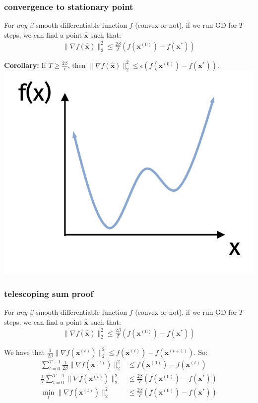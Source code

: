 \documentclass[compress]{beamer}
\newcommand{\bv}[1]{\mathbf{#1}}
\begin{document}
\begin{frame}[t]
	\frametitle{convergence to stationary point}
	\begin{theorem}
	For \emph{any} $\beta$-smooth differentiable function $f$ (convex or not), if we run GD for $T$ steps, we can find a point $\hat{\bv{x}}$ such that:
	\begin{align*}
		\|\nabla f(\hat{\bv{x}})\|_2^2 \leq  \frac{2\beta}{T} \left( f(\bv{x}^{(0)}) -  f(\bv{x}^{*})\right)
	\end{align*} 
\end{theorem}
\textbf{Corollary:} If $T \geq \frac{2\beta}{\epsilon}$, then $\|\nabla f(\hat{\bv{x}})\|_2^2 \leq \epsilon  \left( f(\bv{x}^{(0)}) -  f(\bv{x}^{*})\right)$.
\includegraphics[width=.4\textwidth]{simple_non_convex.png}
\end{frame}

\begin{frame}[t]
	\frametitle{telescoping sum proof}
	\begin{theorem}
		For \emph{any} $\beta$-smooth differentiable function $f$ (convex or not), if we run GD for $T$ steps, we can find a point $\hat{\bv{x}}$ such that:
		\begin{align*}
			\|\nabla f(\hat{\bv{x}})\|_2^2 \leq  \frac{2\beta}{T} \left( f(\bv{x}^{(0)}) -  f(\bv{x}^{*})\right) 
		\end{align*} 
	\end{theorem}
We have that $\frac{1}{2\beta}\|\nabla f(\bv{x}^{(t)})\|_2^2 \leq f(\bv{x}^{(t)}) - f(\bv{x}^{(t+1)}).$ So: 
\begin{align*}
	\sum_{t=0}^{T-1}\frac{1}{2\beta}\|\nabla f(\bv{x}^{(t)})\|_2^2 &\leq f(\bv{x}^{(0)}) -  f(\bv{x}^{(t)})\\
	\frac{1}{T}\sum_{t=0}^{T-1}\|\nabla f(\bv{x}^{(t)})\|_2^2 &\leq \frac{2\beta}{T} \left( f(\bv{x}^{(0)}) -  f(\bv{x}^{*})\right)\\
	\min_t \|\nabla f(\bv{x}^{(t)})\|_2^2 &\leq \frac{2\beta}{T} \left( f(\bv{x}^{(0)}) -  f(\bv{x}^{*})\right)
\end{align*}
\end{frame}
\end{document}
